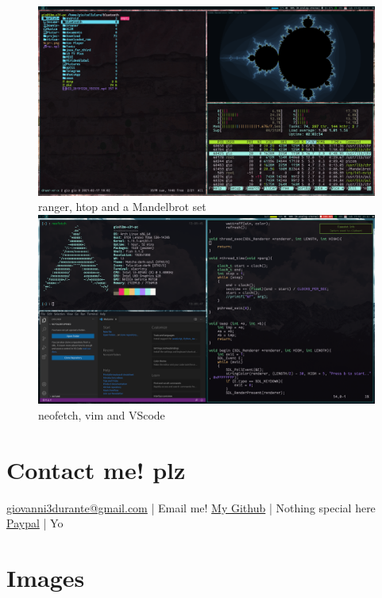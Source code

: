 \documentclass{article}
\begin{document}
\begin{figure}[h!]
    \includegraphics[width=19.3cm]{prew2.png}
    ranger, htop and a Mandelbrot set
    \newline
    \includegraphics[width=19.3cm]{prew3.png}
    neofetch, vim and VScode
    \newline
\end{figure}

\section*{Contact me! plz}
\href{mailto:giovanni3durante@gmail.com}{giovanni3durante@gmail.com} | Email me!
\newline
\href{https://github.com/durryx}{My Github} | Nothing special here
\newline
\href{https://www.paypal.com/paypalme/durrysas}{Paypal} | Yo

\section*{Images}
\end{document}
